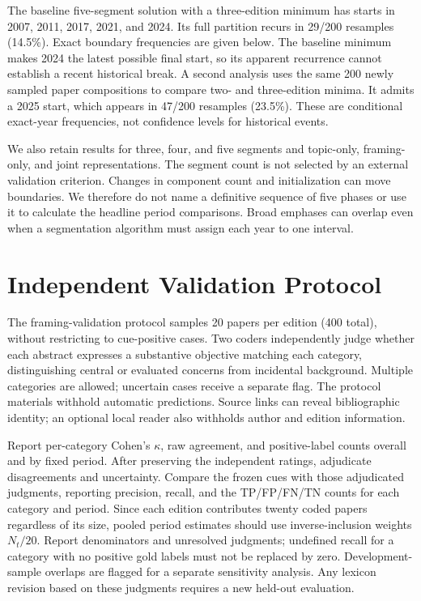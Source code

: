 The baseline five-segment solution with a three-edition minimum has starts in 2007, 2011, 2017, 2021, and 2024. Its full partition recurs in 29/200 resamples (14.5\%). Exact boundary frequencies are given below. The baseline minimum makes 2024 the latest possible final start, so its apparent recurrence cannot establish a recent historical break. A second analysis uses the same 200 newly sampled paper compositions to compare two- and three-edition minima. It admits a 2025 start, which appears in 47/200 resamples (23.5\%). These are conditional exact-year frequencies, not confidence levels for historical events.

We also retain results for three, four, and five segments and topic-only, framing-only, and joint representations. The segment count is not selected by an external validation criterion. Changes in component count and initialization can move boundaries. We therefore do not name a definitive sequence of five phases or use it to calculate the headline period comparisons. Broad emphases can overlap even when a segmentation algorithm must assign each year to one interval.

\section{Independent Validation Protocol}
\label{app:validation}
The framing-validation protocol samples 20 papers per edition (400 total), without restricting to cue-positive cases. Two coders independently judge whether each abstract expresses a substantive objective matching each category, distinguishing central or evaluated concerns from incidental background. Multiple categories are allowed; uncertain cases receive a separate flag. The protocol materials withhold automatic predictions. Source links can reveal bibliographic identity; an optional local reader also withholds author and edition information.

Report per-category Cohen's $\kappa$, raw agreement, and positive-label counts overall and by fixed period. After preserving the independent ratings, adjudicate disagreements and uncertainty. Compare the frozen cues with those adjudicated judgments, reporting precision, recall, and the TP/FP/FN/TN counts for each category and period. Since each edition contributes twenty coded papers regardless of its size, pooled period estimates should use inverse-inclusion weights $N_t/20$. Report denominators and unresolved judgments; undefined recall for a category with no positive gold labels must not be replaced by zero. Development-sample overlaps are flagged for a separate sensitivity analysis. Any lexicon revision based on these judgments requires a new held-out evaluation.

